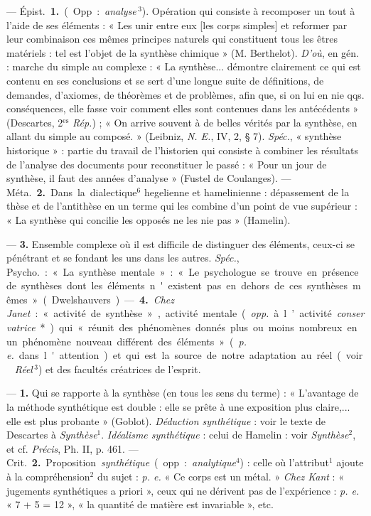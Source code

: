 \begin{itemize}[leftmargin=1cm, label=, itemsep=1pt]
 —  \si{Épist.} {\bf 1.} (Opp. :
{\it analyse}$\,^3$). Opération qui consiste à recomposer un tout à l’aide de
ses éléments : « Les unir entre eux [les corps simples] et reformer par leur
combinaison ces mêmes principes naturels qui constituent tous les êtres
matériels : tel est l’objet de la synthèse chimique » (M. Berthelot).
{\it D'où}, en gén. : marche du simple au complexe : « La synthèse...
démontre clairement ce qui est contenu en ses conclusions et se sert d’une
longue suite de définitions, de demandes, d’axiomes, de théorèmes et de
problèmes, afin que, si on lui en nie qqs. conséquences, elle fasse voir
comment elles sont contenues dans les antécédents » (Descartes,
2$^\text{es}$ {\it Rép.}) ; « On arrive souvent à de belles vérités par la
synthèse, en allant du simple au composé. » (Leibniz, {\it N. E.}, IV, 2, §
7). {\it Spéc.}, « synthèse historique » : partie du travail de l’historien
qui consiste à combiner les résultats de l’analyse des documents pour
reconstituer le passé : « Pour un jour de synthèse, il faut des années
d'analyse » (Fustel de Coulanges). — \si{Méta.} {\bf 2.} Dans la
dialectique$^6$ hegelienne et hamelinienne : dépassement de la thèse et de
l’antithèse en un terme qui les combine d’un point de vue supérieur : « La
synthèse qui concilie les opposés ne les nie pas » (Hamelin).

—  {\bf 3.} Ensemble complexe où il est difficile de
distinguer des éléments, ceux-ci se pénétrant et se fondant les uns dans les
autres. {\it Spéc.}, \si{Psycho.} : « La synthèse mentale » : « Le
psychologue se trouve en présence de synthèses dont les éléments n'existent
pas en dehors de ces synthèses mêmes. » (Dwelshauvers). — {\bf 4.} {\it Chez
Janet} : « activité de synthèse », activité mentale ({\it opp.} à l’activité
{\it conservatrice}*) qui « réunit des phénomènes donnés plus ou moins
nombreux en un phénomène nouveau différent des éléments » ({\it p. e.} dans
l'attention) et qui est la source de notre adaptation au réel (voir {\it
Réel}$\,^3$) et des facultés créatrices de l'esprit.

 — {\bf 1.} Qui se rapporte à la synthèse (en tous les sens
du terme) : « L'avantage de la méthode synthétique est double : elle se
prête à une exposition plus claire,... elle est plus probante » (Goblot).
{\it Déduction synthétique} : voir le texte de Descartes à
{\it Synthèse}$^1$. {\it Idéalisme synthétique} : celui de Hamelin : voir
{\it Synthèse}$^2$, et cf. {\it Précis}, Ph. II, p. 461.
— \si{Crit.} {\bf 2.} Proposition {\it synthétique} (opp. :
{\it analytique}$^4$) : celle où l’attribut$^1$ ajoute à la compréhension$^2$
du sujet : {\it p. e.} « Ce corps est un métal. » {\it Chez Kant} : «
jugements synthétiques a priori », ceux qui ne dérivent pas de
l'expérience : {\it p. e.} « 7 + 5 = 12 », « la quantité de matière est
invariable », etc.


\end{itemize}
